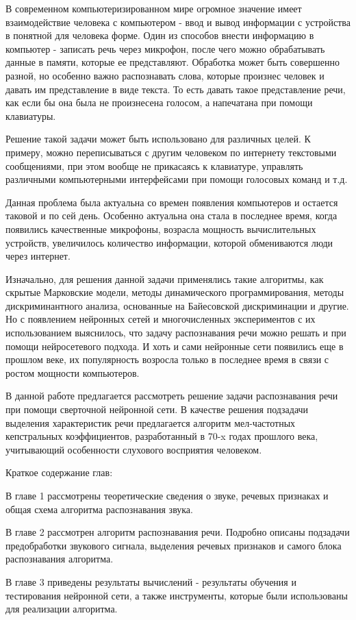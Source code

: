 В современном компьютеризированном мире огромное значение имеет взаимодействие человека с компьютером - ввод и вывод информации с устройства в понятной для человека форме. Один из способов внести информацию в компьютер - записать речь через микрофон, после чего можно обрабатывать данные в памяти, которые ее представляют. Обработка может быть совершенно разной, но особенно важно распознавать слова, которые произнес человек и давать им представление в виде текста. То есть давать такое представление речи, как если бы она была не произнесена голосом, а напечатана при помощи клавиатуры. 

Решение такой задачи может быть использовано для различных целей. К примеру, можно переписываться с другим человеком по интернету текстовыми сообщениями, при этом вообще не прикасаясь к клавиатуре, управлять различными компьютерными интерфейсами при помощи голосовых команд и т.д.

Данная проблема была актуальна со времен появления компьютеров и остается таковой и по сей день. Особенно актуальна она стала в последнее время, когда появились качественные микрофоны, возрасла мощность вычислительных устройств, увеличилось количество информации, которой обмениваются люди через интернет.

Изначально, для решения данной задачи применялись такие алгоритмы, как скрытые Марковские модели, методы динамического программирования, методы дискриминантного анализа, основанные на Байесовской дискриминации и другие. Но с появлением нейронных сетей и многочисленных экспериментов с их использованием выяснилось, что задачу распознавания речи можно решать и при помощи нейросетевого подхода. И хоть и сами нейронные сети появились еще в прошлом веке, их популярность возросла только в последнее время в связи с ростом мощности компьютеров.

В данной работе предлагается рассмотреть решение задачи распознавания речи при помощи сверточной нейронной сети. В качестве решения подзадачи выделения характеристик речи предлагается алгоритм мел-частотных кепстральных коэффициентов, разработанный в 70-x годах прошлого века, учитывающий особенности слухового восприятия человеком.

Краткое содержание глав:

В главе 1 рассмотрены теоретические сведения о звуке, речевых признаках и общая схема алгоритма распознавания звука. 
 
В главе 2 рассмотрен алгоритм распознавания речи. Подробно описаны подзадачи предобработки звукового сигнала, выделения речевых признаков и самого блока распознавания алгоритма.

В главе 3 приведены результаты вычислений - результаты обучения и тестирования нейронной сети, а также инструменты, которые были использованы для реализации алгоритма.